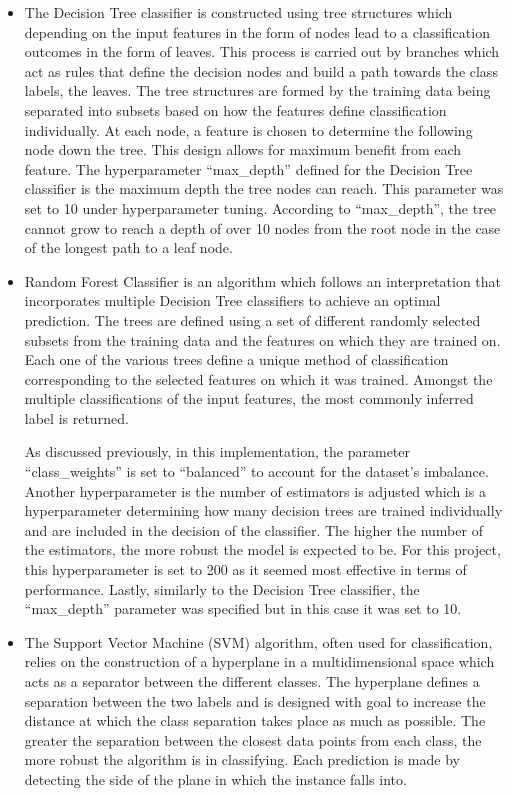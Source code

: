 \documentclass{l4proj}
\begin{document}
\begin{itemize}
\item The Decision Tree classifier is constructed using tree structures which depending on the input features in the form of nodes lead to a classification outcomes in the form of leaves. This process is carried out by branches which act as rules that define the decision nodes and build a path towards the class labels, the leaves. The tree structures are formed by the training data being separated into subsets based on how the features define classification individually. At each node, a feature is chosen to determine the following node down the tree. This design allows for maximum benefit from each feature.
The hyperparameter “max\_depth” defined for the Decision Tree classifier is the maximum depth the tree nodes can reach. This parameter was set to 10 under hyperparameter tuning. According to “max\_depth”, the tree cannot grow to reach a depth of over 10 nodes from the root node in the case of the longest path to a leaf node. 

\item Random Forest Classifier is an algorithm which follows an interpretation that incorporates multiple Decision Tree classifiers to achieve an optimal prediction. The trees are defined using a set of different randomly selected subsets from the training data and the features on which they are trained on. Each one of the various trees define a unique method of classification corresponding to the selected features on which it was trained. Amongst the multiple classifications of the input features, the most commonly inferred label is returned.

As discussed previously, in this implementation, the parameter “class\_weights” is set to “balanced” to account for the dataset’s imbalance. Another hyperparameter is the number of estimators is adjusted which is a hyperparameter determining how many decision trees are trained individually and are included in the decision of the classifier. The higher the number of the estimators, the more robust the model is expected to be. For this project, this hyperparameter is set to 200 as it seemed most effective in terms of performance. Lastly, similarly to the Decision Tree classifier, the “max\_depth” parameter was specified but in this case it was set to 10.

\item The Support Vector Machine (SVM) algorithm, often used for classification, relies on the construction of a hyperplane in a multidimensional space which acts as a separator between the different classes. The hyperplane defines a separation between the two labels and is designed with goal to increase the distance at which the class separation takes place as much as possible. The greater the separation between the closest data points from each class, the more robust the algorithm is in classifying. Each prediction is made by detecting the side of the plane in which the instance falls into.


\end{itemize}
\end{document}
